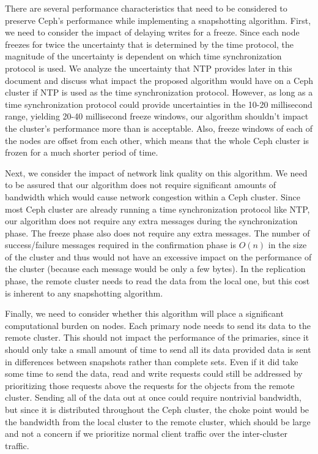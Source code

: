 There are several performance characteristics that need to be
considered to preserve Ceph's performance while implementing a
snapshotting algorithm. First, we need to consider the impact of
delaying writes for a freeze. Since each node freezes for twice the
uncertainty that is determined by the time protocol, the magnitude of
the uncertainty is dependent on which time synchronization protocol is
used. We analyze the uncertainty that NTP provides later in this
document and discuss what impact the proposed algorithm would have on a Ceph
cluster if NTP is used as the time synchronization protocol. However,
as long as a time synchronization protocol could provide uncertainties
in the 10-20 millisecond range, yielding 20-40 millisecond freeze %
windows, our algorithm shouldn't impact the cluster's performance
more than is acceptable. Also, freeze windows of each of the nodes are offset
from each other, which means that the whole Ceph cluster is frozen
for a much shorter period of time.

Next, we consider the impact of network link quality on this algorithm. We
need to be assured that our algorithm does not require significant
amounts of bandwidth which would cause network congestion within a
Ceph cluster. Since most Ceph cluster are already running a time
synchronization protocol like NTP, our algorithm does not require any
extra messages during the synchronization phase. The freeze phase also
does not require any extra messages. The number of success/failure
messages required in the confirmation phase is $O(n)$ in the size of
the cluster and thus would not have an excessive impact on the
performance of the cluster (because each message would be only a few
bytes). In the replication phase, the remote cluster needs to read
the data from the local one, but this cost is inherent to any
snapshotting algorithm.

Finally, we need to consider whether this algorithm will place a
significant computational burden on nodes. Each primary node needs to
send its data to the remote cluster. This should not impact the
performance of the primaries, since it should only take a small amount
of time to send all its data provided data is sent in differences
between snapshots rather than complete sets. Even if it did take some
time to send the data, read and write requests could still be
addressed by prioritizing those requests above the requests for the
objects from the remote cluster. Sending all of the data out at
once could require nontrivial bandwidth, but since it is distributed
throughout the Ceph cluster, the choke point would be the bandwidth
from the local cluster to the remote cluster, which should be large
and not a concern if we prioritize normal client traffic over the
inter-cluster traffic.

